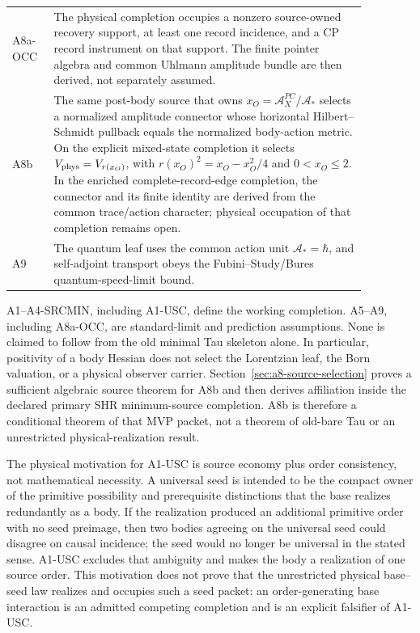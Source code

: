 \documentclass[11pt]{article}
\begin{document}
\begin{longtable}{L{0.10\linewidth}L{0.77\linewidth}}
A8a-OCC & The physical completion occupies a nonzero source-owned recovery
support, at least one record incidence, and a CP record instrument on that
support.  The finite pointer algebra and common Uhlmann amplitude bundle are
then derived, not separately assumed.\\
A8b & The same post-body source that owns
\(x_O=\mathcal A_X^{PC}/\mathcal A_*\) selects a normalized amplitude
connector whose horizontal Hilbert--Schmidt pullback equals the normalized
body-action metric.  On the explicit mixed-state completion it selects
\(V_{\rm phys}=V_{r(x_O)}\), with
\(r(x_O)^2=x_O-x_O^2/4\) and \(0<x_O\leq2\).  In the enriched
complete-record-edge completion, the connector and its finite identity are
derived from the common trace/action character; physical occupation of that
completion remains open.\\
A9 & The quantum leaf uses the common action unit \(\mathcal A_*=\hbar\), and
self-adjoint transport obeys the Fubini--Study/Bures quantum-speed-limit
bound.\\
\bottomrule
\end{longtable}
\normalsize

A1--A4-SRCMIN, including A1-USC, define the working completion.  A5--A9, including A8a-OCC,
are standard-limit and
prediction assumptions.  None is claimed to follow from the old minimal Tau
skeleton alone.  In particular, positivity of a body Hessian does not select
the Lorentzian leaf, the Born valuation, or a physical observer carrier.
Section~\ref{sec:a8-source-selection} proves a sufficient algebraic source
theorem for A8b and then derives affiliation inside the declared primary SHR
minimum-source completion.  A8b is therefore a conditional theorem of that
MVP packet, not a theorem of old-bare Tau or an unrestricted
physical-realization result.

The physical motivation for A1-USC is source economy plus order consistency,
not mathematical necessity.  A universal seed is intended to be the compact
owner of the primitive possibility and prerequisite distinctions that the
base realizes redundantly as a body.  If the realization produced an
additional primitive order with no seed preimage, then two bodies agreeing on
the universal seed could disagree on causal incidence; the seed would no
longer be universal in the stated sense.  A1-USC excludes that ambiguity and
makes the body a realization of one source order.  This motivation does not
prove that the unrestricted physical base--seed law realizes and occupies such
a seed packet: an order-generating base interaction is an admitted competing
completion and is an explicit falsifier of A1-USC.
\end{document}
